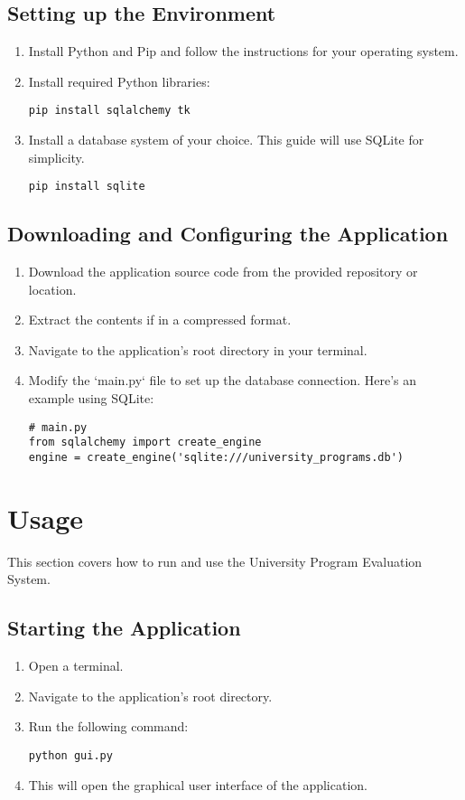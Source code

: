 \documentclass{article}
\begin{document}
		\subsection{Setting up the Environment}
		\begin{enumerate}
		    \item Install Python and Pip and follow the instructions for your operating system.
		    \item Install required Python libraries:
		    \begin{verbatim}
pip install sqlalchemy tk
		    \end{verbatim}
		    \item Install a database system of your choice. This guide will use SQLite for simplicity.
		    \begin{verbatim}
pip install sqlite
		    \end{verbatim}
		\end{enumerate}

		\subsection{Downloading and Configuring the Application}
		\begin{enumerate}
		    \item Download the application source code from the provided repository or location.
		    \item Extract the contents if in a compressed format.
		    \item Navigate to the application's root directory in your terminal.
		    \item Modify the `main.py` file to set up the database connection. Here's an example using SQLite:
		    \begin{verbatim}
# main.py
from sqlalchemy import create_engine
engine = create_engine('sqlite:///university_programs.db')
		    \end{verbatim}
		\end{enumerate}

		\section*{Usage}
		This section covers how to run and use the University Program Evaluation System.

		\subsection{Starting the Application}
		\begin{enumerate}
		    \item Open a terminal.
		    \item Navigate to the application's root directory.
		    \item Run the following command:
		    \begin{verbatim}
python gui.py
		    \end{verbatim}
		    \item This will open the graphical user interface of the application.
		\end{enumerate}
\end{document}
